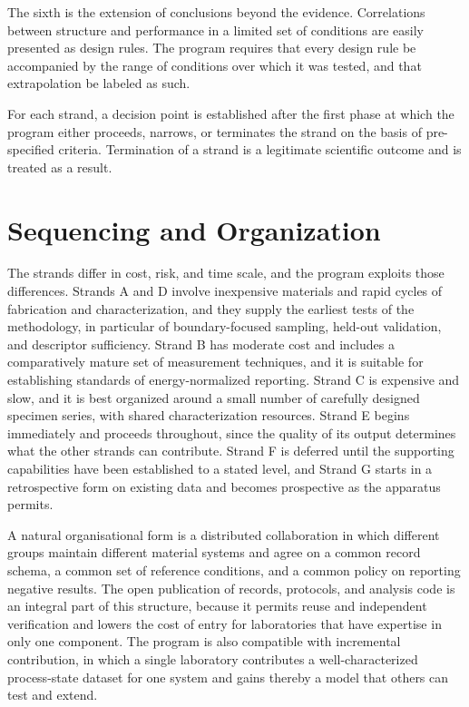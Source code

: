 \documentclass[11pt]{article}
\theoremstyle{definition}
\begin{document}
The sixth is the extension of conclusions beyond the evidence. Correlations between structure and performance in a limited set of conditions are easily presented as design rules. The program requires that every design rule be accompanied by the range of conditions over which it was tested, and that extrapolation be labeled as such.

For each strand, a decision point is established after the first phase at which the program either proceeds, narrows, or terminates the strand on the basis of pre-specified criteria. Termination of a strand is a legitimate scientific outcome and is treated as a result.

\section{Sequencing and Organization}

The strands differ in cost, risk, and time scale, and the program exploits those differences. Strands A and D involve inexpensive materials and rapid cycles of fabrication and characterization, and they supply the earliest tests of the methodology, in particular of boundary-focused sampling, held-out validation, and descriptor sufficiency. Strand B has moderate cost and includes a comparatively mature set of measurement techniques, and it is suitable for establishing standards of energy-normalized reporting. Strand C is expensive and slow, and it is best organized around a small number of carefully designed specimen series, with shared characterization resources. Strand E begins immediately and proceeds throughout, since the quality of its output determines what the other strands can contribute. Strand F is deferred until the supporting capabilities have been established to a stated level, and Strand G starts in a retrospective form on existing data and becomes prospective as the apparatus permits.

A natural organisational form is a distributed collaboration in which different groups maintain different material systems and agree on a common record schema, a common set of reference conditions, and a common policy on reporting negative results. The open publication of records, protocols, and analysis code is an integral part of this structure, because it permits reuse and independent verification and lowers the cost of entry for laboratories that have expertise in only one component. The program is also compatible with incremental contribution, in which a single laboratory contributes a well-characterized process-state dataset for one system and gains thereby a model that others can test and extend.
\end{document}

